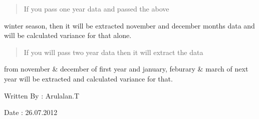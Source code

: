 \documentclass[letterpaper,10pt,english]{sphinxmanual}
\begin{document}
\begin{fulllineitems}
\begin{description}
\begin{quote}
If you pass one year data and passed the above
\end{quote}

winter season, then it will be extracted november and december
months data and will be calculated variance for that alone.
\begin{quote}

If you will pass two year data then it will extract the data
\end{quote}

from november \& december of first year and january, feburary \&
march of next year will be extracted and calculated variance
for that.

\end{description}

Written By : Arulalan.T

Date : 26.07.2012

\end{fulllineitems}

\end{document}
